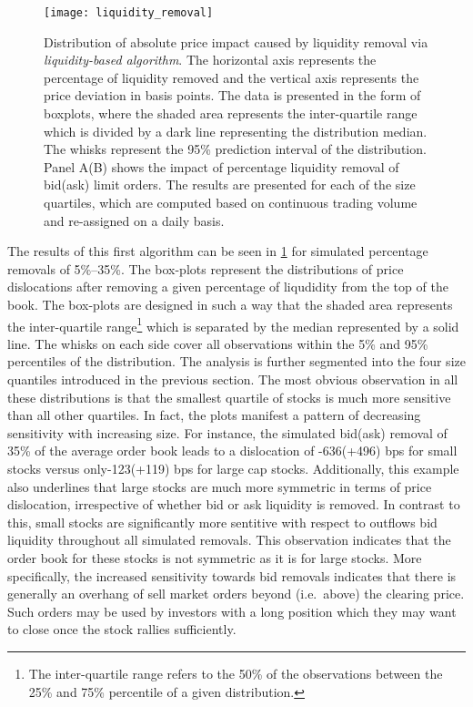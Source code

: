 \documentclass[11pt,a4paper]{article}
\begin{document}
    \begin{figure}[!t]
        \centering
        \texttt{[image: liquidity\_removal]}
        \caption{Distribution of absolute price impact caused by liquidity removal via \textit{liquidity-based algorithm}. The horizontal axis represents the percentage of liquidity removed and the vertical axis represents the price deviation in basis points. The data is presented in the form of boxplots, where the shaded area represents the inter-quartile range which is divided by a dark line representing the distribution median. The whisks represent the 95\% prediction interval of the distribution. Panel A(B) shows the impact of percentage liquidity removal of bid(ask) limit orders. The results are presented for each of the size quartiles, which are computed based on continuous trading volume and re-assigned on a daily basis.}
        \label{fig:LiquidityBasedAlgorithm}
    \end{figure}

    The results of this first algorithm can be seen in \cref{fig:LiquidityBasedAlgorithm} for simulated percentage removals of {5\%--35\%}. The box-plots represent the distributions of price dislocations after removing a given percentage of liqudidity from the top of the book. The box-plots are designed in such a way that the shaded area represents the inter-quartile range\footnote{The inter-quartile range refers to the 50\% of the observations between the 25\% and 75\% percentile of a given distribution.} which is separated by the median represented by a solid line. The whisks on each side cover all observations within the 5\% and 95\% percentiles of the distribution. The analysis is further segmented into the four size quantiles introduced in the previous section. The most obvious observation in all these distributions is that the smallest quartile of stocks is much more sensitive than all other quartiles. In fact, the plots manifest a pattern of decreasing sensitivity with increasing size. For instance, the simulated bid(ask) removal of 35\% of the average order book leads to a dislocation of -636(+496) bps for small stocks versus only-123(+119) bps for large cap stocks. Additionally, this example also underlines that large stocks are much more symmetric in terms of price dislocation, irrespective of whether bid or ask liquidity is removed. In contrast to this, small stocks are significantly more sentitive with respect to outflows bid liquidity throughout all simulated removals. This observation indicates that the order book for these stocks is not symmetric as it is for large stocks. More specifically, the increased sensitivity towards bid removals indicates that there is generally an overhang of sell market orders beyond (i.e.\ above) the clearing price. Such orders may be used by investors with a long position which they may want to close once the stock rallies sufficiently.
\end{document}
